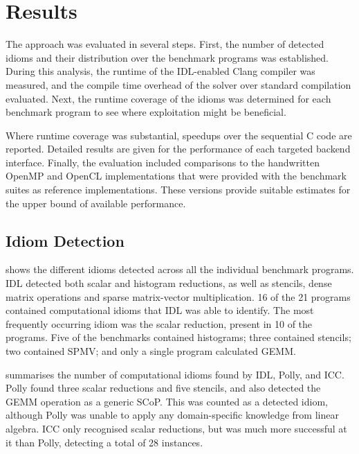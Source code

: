\section{Results}
\label{sec:idiomresults}

    The approach was evaluated in several steps.
    First, the number of detected idioms and their distribution over the
    benchmark programs was established.
    During this analysis, the runtime of the IDL-enabled Clang compiler was
    measured, and the compile time overhead of the solver over standard
    compilation evaluated.
    Next, the runtime coverage of the idioms was determined for each
    benchmark program to see where exploitation might be beneficial.

    Where runtime coverage was substantial, speedups over the sequential C code
    are reported.
    Detailed results are given for the performance of each targeted backend
    interface.
    Finally, the evaluation included comparisons to the handwritten OpenMP and
    OpenCL implementations that were provided with the benchmark suites as
    reference implementations.
    These versions provide suitable estimates for the upper bound of available
    performance.

\subsection{Idiom Detection}

     shows the different idioms detected across
    all the individual benchmark programs.
    IDL detected both scalar and histogram reductions, as well as stencils,
    dense matrix operations and sparse matrix-vector multiplication.
    16 of the 21 programs contained computational idioms that IDL was able to
    identify.
    The most frequently occurring idiom was the scalar reduction, present in 10
    of the programs.
    Five of the benchmarks contained histograms; three contained stencils;
    two contained SPMV; and only a single program calculated GEMM.

     summarises the number of computational idioms found by
    IDL, Polly, and ICC.
    Polly found three scalar reductions and five stencils, and also detected the
    GEMM operation as a generic SCoP.
    This was counted as a detected idiom, although Polly was unable to apply any
    domain-specific knowledge from linear algebra.
    ICC only recognised scalar reductions, but was much more successful at it
    than Polly, detecting a total of 28 instances.

